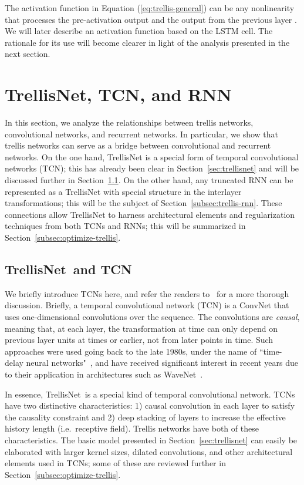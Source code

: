 \documentclass{article} \usepackage{iclr2019_conference,times}
\newcommand{\model}{TrellisNet}
\begin{document}
The activation function  in Equation (\ref{eq:trellis-general}) can be any nonlinearity that processes the pre-activation output \small\normalsize and the output from the previous layer \small\normalsize. We will later describe an activation function based on the LSTM cell. The rationale for its use will become clearer in light of the analysis presented in the next section.

\section{TrellisNet, TCN, and RNN}
\label{sec:rnn-tcn-relationship}

In this section, we analyze the relationships between trellis networks, convolutional networks, and recurrent networks.
In particular, we show that trellis networks can serve as a bridge between convolutional and recurrent networks. On the one hand, TrellisNet is a special form of temporal convolutional networks (TCN); this has already been clear in Section~\ref{sec:trellisnet} and will be discussed further in Section~\ref{subsec:trellis-tcn}. On the other hand, any truncated RNN can be represented as a TrellisNet with special structure in the interlayer transformations; this will be the subject of Section~\ref{subsec:trellis-rnn}. These connections allow TrellisNet to harness architectural elements and regularization techniques from both TCNs and RNNs; this will be summarized in Section~\ref{subsec:optimize-trellis}.

\subsection{\model~and TCN}
\label{subsec:trellis-tcn}

We briefly introduce TCNs here, and refer the readers to~\cite{bai2018empirical} for a more thorough discussion. Briefly, a temporal convolutional network (TCN) is a ConvNet that uses one-dimensional convolutions over the sequence. The convolutions are \emph{causal}, meaning that, at each layer, the transformation at time  can only depend on previous layer units at times  or earlier, not from later points in time. Such approaches were used going back to the late 1980s, under the name of ``time-delay neural networks"~\citep{waibel}, and have received significant interest in recent years due to their application in architectures such as WaveNet~\citep{waveNet}.

In essence, \model~is a special kind of temporal convolutional network. TCNs have two distinctive characteristics: 1) causal convolution in each layer to satisfy the causality constraint and 2) deep stacking of layers to increase the effective history length (i.e.\ receptive field). Trellis networks have both of these characteristics. The basic model presented in Section~\ref{sec:trellisnet} can easily be elaborated with larger kernel sizes, dilated convolutions, and other architectural elements used in TCNs; some of these are reviewed further in Section~\ref{subsec:optimize-trellis}.
\end{document}
